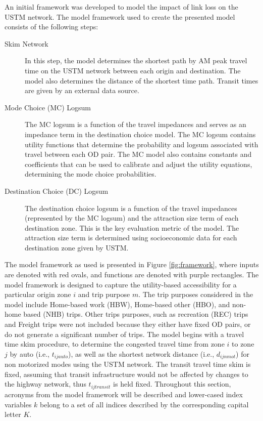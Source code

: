 An initial framework was developed to model the impact of link loss on the
USTM network. The model framework used to create the presented model
consists of the following steps:
\begin{description}
	\item [Skim Network] {In this step, the model determines the shortest
  path by AM peak travel time on the USTM network between each origin and
  destination. The model also determines the distance of the shortest time
  path. Transit times are given by an external data source.}
	\item [Mode Choice (MC) Logsum] {The MC logsum is a function of
  the travel impedances and serves as an impedance term in the destination
  choice model. The MC logsum contains utility functions that
  determine the probability and logsum associated with travel between each OD
  pair. The MC model also contains constants and coefficients that can
  be used to calibrate and adjust the utility equations, determining the mode
  choice probabilities.}
	\item [Destination Choice (DC) Logsum] {The destination choice logsum
  is a function of the travel impedances (represented by the MC logsum)
  and the attraction size term of each destination zone. This is the key
  evaluation metric of the model. The attraction size term is determined
  using socioeconomic data for each destination zone given by USTM.}
\end{description}
The model framework as used is presented in Figure \ref{fig:framework}, where
inputs are denoted with red ovals, and functions are denoted with purple rectangles.
The model framework is designed to capture the utility-based accessibility for
a particular origin zone \(i\) and trip purpose \(m\). The trip purposes considered
in the model include Home-based work (HBW), Home-based other (HBO),
and non-home based (NHB) trips. Other trips purposes, such as recreation (REC) trips and
Freight trips were not included because they either have fixed OD pairs, or do not generate a significant number of trips.
The model begins with a
travel time skim procedure, to determine the congested travel time from zone
\(i\) to zone \(j\) by auto (i.e., \(t_{ijauto}\)), as well as the shortest network distance (i.e., \(d_{ijnmot}\)) for non
motorized modes using the USTM network. The transit travel time skim is fixed, assuming that transit
infrastructure would not be affected by changes to the highway network, thus \(t_{ijtransit}\) is held fixed.
Throughout this section, acronyms from the model framework will be described and lower-cased index variables \(k\) belong to a set of
all indices described by the corresponding capital letter \(K\).

